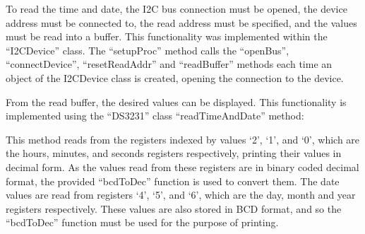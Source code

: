 To read the time and date, the I2C bus connection must be opened, the device
address must be connected to, the read address must be specified, and the values
must be read into a buffer.
This functionality was implemented within the ``I2CDevice'' class. The
``setupProc'' method calls the ``openBus'', ``connectDevice'', ``resetReadAddr''
and ``readBuffer'' methods each time an object of the I2CDevice class is
created, opening the connection to the device.



From the read buffer, the desired values can be displayed. This functionality is
implemented using the ``DS3231'' class ``readTimeAndDate'' method:



This method reads from the registers indexed by values `2', `1', and `0', which
are the hours, minutes, and seconds registers respectively, printing their
values in decimal form. As the values read from these registers are in binary
coded decimal format, the provided ``bcdToDec'' function is used to convert
them. The date values are read from registers `4', `5', and `6', which are the
day, month and year registers respectively. These values are also stored in BCD
format, and so the ``bcdToDec'' function must be used for the purpose of
printing.

